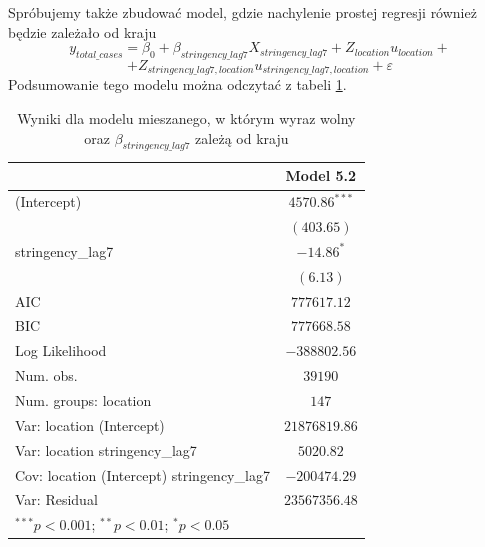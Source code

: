 \documentclass[12pt]{mwbk}
\theoremstyle{plain}
\theoremstyle{definition}
\theoremstyle{definition}
\begin{document}
Spróbujemy także zbudować model, gdzie nachylenie prostej regresji również będzie zależało od kraju
$$y_{total\_cases}=\beta_0+\beta_{stringency\_lag7} X_{stringency\_lag7}+Z_{location}u_{location}+$$$$+Z_{stringency\_lag7,location}u_{stringency\_lag7,location}+\varepsilon$$
Podsumowanie tego modelu można odczytać z tabeli \ref{table:mod5-slope}.
\begin{table}[!htpb]
	\begin{center}
		\begin{tabular}{l c}
			\hline
			& Model 5.2 \\
			\hline
			(Intercept)                                & $4570.86^{***}$ \\
			& $(403.65)$      \\
			stringency\_lag7                           & $-14.86^{*}$    \\
			& $(6.13)$        \\
			\hline
			AIC                                        & $777617.12$     \\
			BIC                                        & $777668.58$     \\
			Log Likelihood                             & $-388802.56$    \\
			Num. obs.                                  & $39190$         \\
			Num. groups: location                      & $147$           \\
			Var: location (Intercept)                  & $21876819.86$   \\
			Var: location stringency\_lag7             & $5020.82$       \\
			Cov: location (Intercept) stringency\_lag7 & $-200474.29$    \\
			Var: Residual                              & $23567356.48$   \\
			\hline
			\multicolumn{2}{l}{\scriptsize{$^{***}p<0.001$; $^{**}p<0.01$; $^{*}p<0.05$}}
		\end{tabular}
		\caption{Wyniki dla modelu mieszanego, w którym wyraz wolny oraz $\beta_{stringency\_lag7}$ zależą od kraju}
		\label{table:mod5-slope}
	\end{center}
\end{table}
\end{document}
